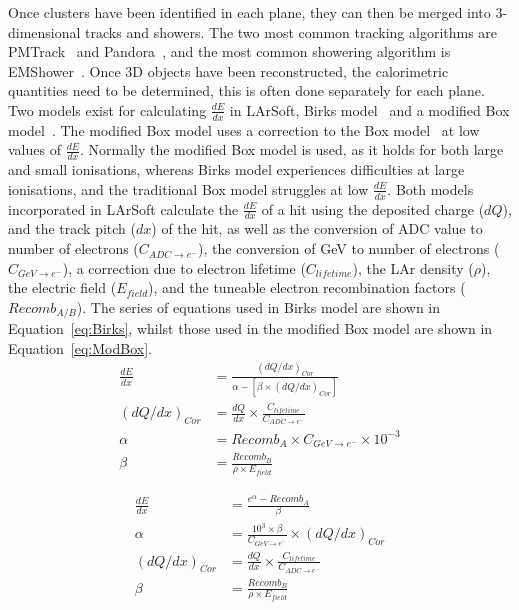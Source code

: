 Once clusters have been identified in each plane, they can then be merged into 3-dimensional tracks and showers. The two most common tracking algorithms are PMTrack~\citep{PMTrack} and Pandora~\citep{Pandora}, and the most common showering algorithm is EMShower~\citep{EMShower}. Once 3D objects have been reconstructed, the calorimetric quantities need to be determined, this is often done separately for each plane. Two models exist for calculating $\frac{dE}{dx}$ in LArSoft, Birks model~\citep{BirksModel} and a modified Box model~\citep{PIDA_Paper}. The modified Box model uses a correction to the Box model~\citep{BoxModel} at low values of $\frac{dE}{dx}$. Normally the modified Box model is used, as it holds for both large and small ionisations, whereas Birks model experiences difficulties at large ionisations, and the traditional Box model struggles at low $\frac{dE}{dx}$. Both models incorporated in LArSoft calculate the $\frac{dE}{dx}$ of a hit using the deposited charge ($dQ$), and the track pitch ($dx$) of the hit, as well as the conversion of ADC value to number of electrons ($C_{ADC \rightarrow e^{-}}$), the conversion of GeV to number of electrons ($C_{GeV \rightarrow e^{-}}$), a correction due to electron lifetime ($C_{lifetime}$), the LAr density ($\rho$), the electric field ($E_{field}$), and the tuneable electron recombination factors ($Recomb_{A/B}$). The series of equations used in Birks model are shown in Equation~\ref{eq:Birks}, whilst those used in the modified Box model are shown in Equation~\ref{eq:ModBox}. \\

\begin{subequations}
  \label{eq:Birks}
  \begin{align}
    \frac{dE}{dx} &= \frac{ (dQ/dx)_{Cor} }{ \alpha - [\beta \times (dQ/dx)_{Cor} ] } \label{eq:Birks_1} \\
    (dQ/dx)_{Cor} &= \frac{dQ}{dx} \times \frac{ C_{lifetime} }{ C_{ADC \rightarrow e^{-}} } \label{eq:Birks_Correc} \\
    \alpha &= Recomb_{A} \times C_{GeV \rightarrow e^{-}} \times 10^{-3} \label{eq:Birks_A}\\
    \beta  &= \frac{ Recomb_{B} }{ \rho \times E_{field} } \label{eq:Birks_B}
  \end{align}
\end{subequations}

\begin{subequations}
  \label{eq:ModBox}
  \begin{align}
    \frac{dE}{dx} &= \frac{ e^{\alpha} - Recomb_{A} }{ \beta } \label{eq:ModBox_1} \\
    \alpha &= \frac{10^3 \times \beta }{ C_{GeV \rightarrow e^{-} } } \times (dQ/dx)_{Cor} \label{eq:ModBox_A}\\
    (dQ/dx)_{Cor} &= \frac{dQ}{dx} \times \frac{ C_{lifetime} }{ C_{ADC \rightarrow e^{-}} } \label{eq:ModBox_Correc} \\
    \beta &= \frac{ Recomb_{B} }{ \rho \times E_{field} } \label{eq:ModBox_B}
  \end{align}
\end{subequations}

